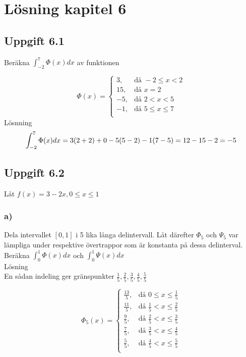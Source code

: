 \documentclass[12pt]{article}
\author{\textbf{\hmwkAuthorName}}
\date{} %
\begin{document}
\section*{Lösning kapitel 6}
\subsection*{Uppgift 6.1}
Beräkna $ \int_{-2}^7 \Phi(x)dx$ av funktionen


\[
\Phi(x)= \begin{cases} 
	3, & \mbox{då } -2 \leq x < 2 \mbox{} \\
	15, & \mbox{då } x = 2\mbox{} \\	
	-5, & \mbox{då } 2 < x < 5 \mbox{} \\	
	-1, & \mbox{då } 5 \leq x \leq 7 \mbox{} \\	
	
\end{cases}
\]
Lösnning
\[
\int_{-2}^7 \Phi(x)dx = 3(2+2) + 0 -5(5-2)-1(7-5)\\
					 = 12-15-2=-5
\]

\subsection*{Uppgift 6.2}
Låt $f(x) = 3-2x, 0\leq x \leq 1$\\[0.5cm]
\subsubsection*{a)}
 Dela intervallet $[0,1]$ i 5 lika långa delintervall. Låt därefter $\Phi_5$ och $\Psi_5$ var lämpliga under respektive övertrappor som är konstanta på dessa delinterval. Beräkna $ \int_0^1 \Phi(x)dx$ och $ \int_0^1 \Psi(x)dx$\\

Lösning \\

En sådan indeling ger gränspunkter $\frac{1}{5}, \frac{2}{5} , \frac{3}{5}, \frac{4}{5}, \frac{5}{5} $


\[
\Phi_5(x)= \begin{cases} 
	\frac{13}{5}, & \mbox{då } 0 \leq x \leq \frac{1}{5} \mbox{} \\
	\frac{11}{5}, & \mbox{då } \frac{1}{5} < x \leq \frac{2}{5} \mbox{} \\	
	\frac{9}{5}, & \mbox{då } \frac{2}{5} < x \leq \frac{3}{5}  \mbox{} \\	
	\frac{7}{5}, &\mbox{då } \frac{3}{5} < x \leq \frac{4}{5} \mbox{} \\	
	\frac{5}{5}, & \mbox{då } \frac{4}{5} < x \leq \frac{5}{5} \mbox{} \\	
\end{cases}
\]
\end{document}
